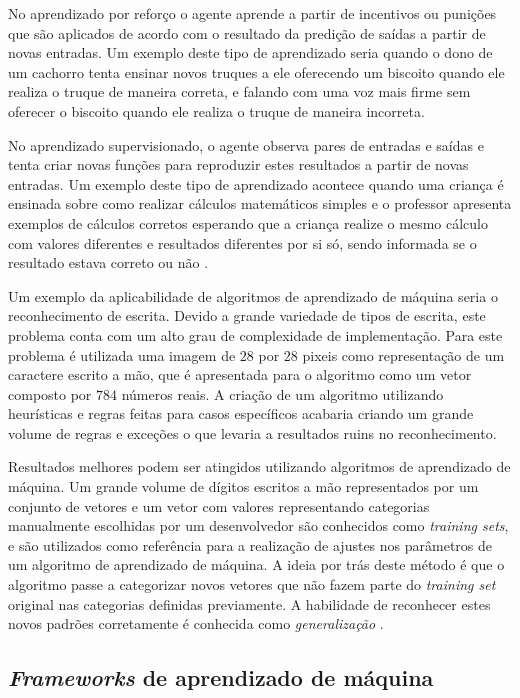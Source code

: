 No aprendizado por reforço o agente aprende a partir de incentivos ou punições que são aplicados de acordo com o resultado da predição de saídas a partir de novas entradas. Um exemplo deste tipo de aprendizado seria quando o dono de um cachorro tenta ensinar novos truques a ele oferecendo um biscoito quando ele realiza o truque de maneira correta, e falando com uma voz mais firme sem oferecer o biscoito quando ele realiza o truque de maneira incorreta. \cite{norvig:780391}

No aprendizado supervisionado, o agente observa pares de entradas e saídas e tenta criar novas funções para reproduzir estes resultados a partir de novas entradas. Um exemplo deste tipo de aprendizado acontece quando uma criança é ensinada sobre como realizar cálculos matemáticos simples e o professor apresenta exemplos de cálculos corretos esperando que a criança realize o mesmo cálculo com valores diferentes e resultados diferentes por si só, sendo informada se o resultado estava correto ou não \cite{norvig:780391}.

Um exemplo da aplicabilidade de algoritmos de aprendizado de máquina seria o reconhecimento de escrita. Devido a grande variedade de tipos de escrita, este problema conta com um alto grau de complexidade de implementação. Para este problema é utilizada uma imagem de $28$ por $28$ pixeis como representação de um caractere escrito a mão, que é apresentada para o algoritmo como um vetor composto por $784$ números reais. A criação de um algoritmo utilizando heurísticas e regras feitas para casos específicos acabaria criando um grande volume de regras e exceções o que levaria a resultados ruins no reconhecimento. \cite{bishop:2006}

Resultados melhores podem ser atingidos utilizando algoritmos de aprendizado de máquina. Um grande volume de dígitos escritos a mão representados por um conjunto de vetores e um vetor com valores representando categorias manualmente escolhidas por um desenvolvedor são conhecidos como \textit{training sets}, e são utilizados como referência para a realização de ajustes nos parâmetros de um algoritmo de aprendizado de máquina. A ideia por trás deste método é que o algoritmo passe a categorizar novos vetores que não fazem parte do \textit{training set} original nas categorias definidas previamente. A habilidade de reconhecer estes novos padrões corretamente é conhecida como \textit{generalização} \cite{bishop:2006}.

\subsection{\textit{Frameworks} de aprendizado de máquina}

